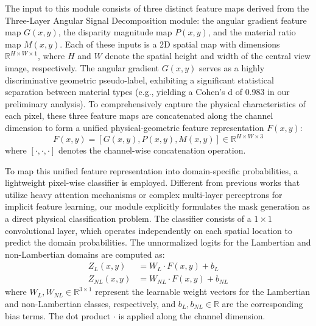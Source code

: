 \documentclass[lettersize,journal]{IEEEtran}
\begin{document}
The input to this module consists of three distinct feature maps derived from the Three-Layer Angular Signal Decomposition module: the angular gradient feature map $G(x,y)$, the disparity magnitude map $P(x,y)$, and the material ratio map $M(x,y)$. Each of these inputs is a 2D spatial map with dimensions $\mathbb{R}^{H \times W \times 1}$, where $H$ and $W$ denote the spatial height and width of the central view image, respectively. The angular gradient $G(x,y)$ serves as a highly discriminative geometric pseudo-label, exhibiting a significant statistical separation between material types (e.g., yielding a Cohen's d of 0.983 in our preliminary analysis). To comprehensively capture the physical characteristics of each pixel, these three feature maps are concatenated along the channel dimension to form a unified physical-geometric feature representation $F(x,y)$:
\begin{equation}
F(x,y) = [G(x,y), P(x,y), M(x,y)] \in \mathbb{R}^{H \times W \times 3}
\end{equation}
where $[\cdot, \cdot, \cdot]$ denotes the channel-wise concatenation operation.

To map this unified feature representation into domain-specific probabilities, a lightweight pixel-wise classifier is employed. Different from previous works that utilize heavy attention mechanisms or complex multi-layer perceptrons for implicit feature learning, our module explicitly formulates the mask generation as a direct physical classification problem. The classifier consists of a $1 \times 1$ convolutional layer, which operates independently on each spatial location to predict the domain probabilities. The unnormalized logits for the Lambertian and non-Lambertian domains are computed as:
\begin{align}
Z_L(x,y) &= W_L \cdot F(x,y) + b_L \\
Z_{NL}(x,y) &= W_{NL} \cdot F(x,y) + b_{NL}
\end{align}
where $W_L, W_{NL} \in \mathbb{R}^{3 \times 1}$ represent the learnable weight vectors for the Lambertian and non-Lambertian classes, respectively, and $b_L, b_{NL} \in \mathbb{R}$ are the corresponding bias terms. The dot product $\cdot$ is applied along the channel dimension.
\end{document}
